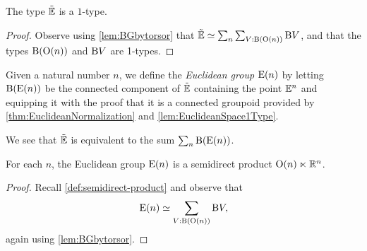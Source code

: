 \begin{lemma}\label{lem:EuclideanSpace1Type}
  The type ${\tilde {\mathbb E}}$ is a $1$-type.
\end{lemma}

\begin{proof}
  Observe using \cref{lem:BGbytorsor} that ${\tilde {\mathbb E}} \simeq \sum_n \sum_{V:\mathrm B (
    \mathrm O(n) )} \mathrm B V$, and that the types $\mathrm B ( \mathrm O(n) )$ and $\mathrm B V$ are
  1-types.
\end{proof}

\begin{definition}\label{def:EuclideanGroup}
  Given a natural number $n$, we define the {\em Euclidean group} $\mathrm E(n)$ by
  letting $\mathrm B (\mathrm E(n))$ be the connected component of ${\tilde {\mathbb E}}$ containing the
  point $\mathbb E^n$ and equipping it with the proof that it is a connected
  groupoid provided by \cref{thm:EuclideanNormalization} and
  \cref{lem:EuclideanSpace1Type}.
\end{definition}

We see that ${\tilde {\mathbb E}}$ is equivalent to the sum $\sum_n \mathrm B (\mathrm E(n))$.

\begin{theorem}\label{thm:EuclideanGroupSemidirect}
  For each $n$, the Euclidean group $\mathrm E(n)$ is a semidirect product
  $\mathrm O(n) \ltimes \mathbb{R}^n$.
\end{theorem}

\begin{proof}
  Recall \cref{def:semidirect-product} and observe that
  $$\mathrm E(n) \simeq \sum_{V:\mathrm B ( \mathrm O(n) )} \mathrm B V,$$
  again using \cref{lem:BGbytorsor}.
\end{proof}
